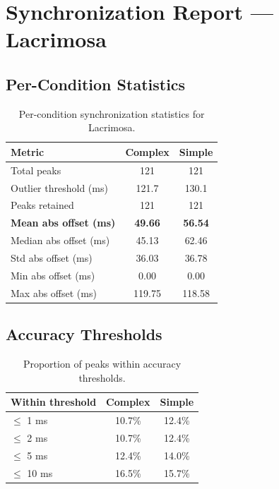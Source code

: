 
\section*{Synchronization Report --- Lacrimosa}

\subsection*{Per-Condition Statistics}

\begin{table}[h!]
\centering
\begin{tabular}{|l|c|c|}
\hline
Metric & Complex & Simple \\
\hline
Total peaks & 121 & 121 \\
Outlier threshold (ms) & 121.7 & 130.1 \\
Peaks retained & 121 & 121 \\
\textbf{Mean abs offset (ms)} & \textbf{49.66} & \textbf{56.54} \\
Median abs offset (ms) & 45.13 & 62.46 \\
Std abs offset (ms) & 36.03 & 36.78 \\
Min abs offset (ms) & 0.00 & 0.00 \\
Max abs offset (ms) & 119.75 & 118.58 \\
\hline
\end{tabular}
\caption{Per-condition synchronization statistics for Lacrimosa.}
\label{tab:sync_stats}
\end{table}

\subsection*{Accuracy Thresholds}

\begin{table}[h!]
\centering
\begin{tabular}{|l|c|c|}
\hline
Within threshold & Complex & Simple \\
\hline
$\leq$ 1 ms & 10.7\% & 12.4\% \\
$\leq$ 2 ms & 10.7\% & 12.4\% \\
$\leq$ 5 ms & 12.4\% & 14.0\% \\
$\leq$ 10 ms & 16.5\% & 15.7\% \\
\hline
\end{tabular}
\caption{Proportion of peaks within accuracy thresholds.}
\label{tab:sync_accuracy}
\end{table}


